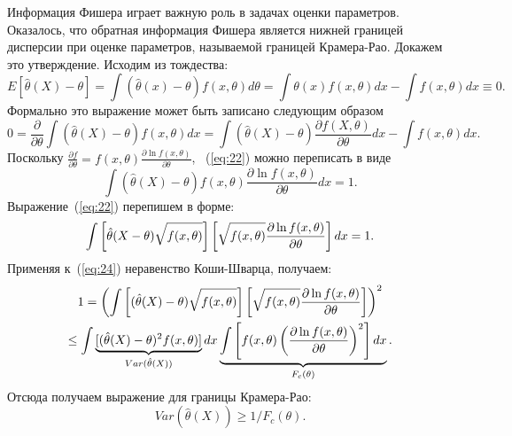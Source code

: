 Информация Фишера играет важную роль в задачах оценки параметров.
Оказалось, что обратная информация Фишера является нижней границей дисперсии при оценке параметров, называемой границей Крамера-Рао.
Докажем это утверждение.
%
Исходим из тождества:
%
\begin{equation}\label{eq:21}
  E[\hat{\theta}(X) - \theta]
  = \int(\hat{\theta}(x) - \theta)f(x,\theta)d\theta
  = \int\theta(x)f(x,\theta)dx - \int f(x,\theta)dx \equiv 0.
\end{equation}
%
Формально это выражение может быть записано следующим образом
%
\begin{equation}\label{eq:22}
  0 = \frac{\partial}{\partial \theta}
    \int(\hat{\theta}(X) - \theta)f(x,\theta)dx
  = \int(\hat{\theta}(X) - \theta)
    \frac{\partial f(X, \theta)}{\partial \theta}dx - \int f(x,\theta)dx.
\end{equation}
%
Поскольку $\frac{\partial f}{\partial \theta} = f(x,\theta)
    \frac{\partial \ln f(x,\theta)}{\partial \theta}$,
~(\ref{eq:22}) можно переписать в виде
%
\begin{equation}
    \label{eq:23}
        \int(\hat{\theta}(X) - \theta)
            f(x,\theta) \frac{\partial \ln f(x,\theta)}
        {\partial \theta}dx = 1.
\end{equation}
%
Выражение~(\ref{eq:22}) перепишем в форме:
%
\begin{equation}
    \label{eq:24}
        \int \left[\hat{\theta}(X-\theta)\Large \sqrt{\mathstrut f(x,\theta)}\right]
            \left[\Large\sqrt{\mathstrut f(x,\theta)}
                \frac{\partial \ln f(x,\theta)}{\partial \theta}\right]dx = 1.
\end{equation}
%
Применяя к~(\ref{eq:24}) неравенство Коши-Шварца, получаем:
%
\begin{multline}
    \label{eq:25}
        1 = \left( \int \left[(\hat{\theta}(X)-\theta)
            \Large \sqrt{\mathstrut f(x,\theta)}\right]
                \left[\Large \sqrt{\mathstrut f(x,\theta)}
                    \frac{\partial \ln f(x,\theta)}{\partial \theta} \right]
                 \right)^2 \\
                \leq \int
            \underbrace{[(\hat{\theta}(X) - \theta)^2 f(x,\theta)]}_{Var(\hat{\theta}(X))}dx
        \underbrace{\int\left[f(x,\theta)\left( \frac{\partial \ln f(x,\theta)}
    {\partial \theta} \right)^2 \right]dx}_{F_c(\theta)}.
\end{multline}
%
Отсюда получаем выражение для границы Крамера-Рао:
%
\begin{equation}
    \label{eq:26}
        Var(\hat{\theta}(X)) \geq 1/{F_c (\theta)}.
\end{equation}




